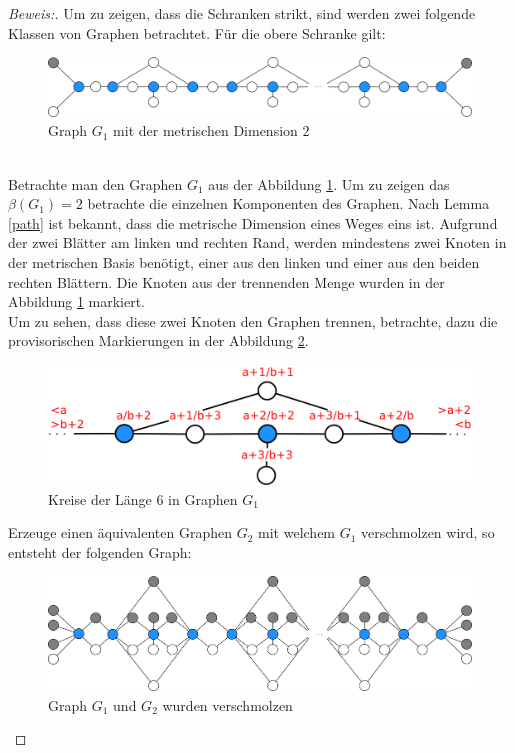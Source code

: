 \begin{proof}[Beweis:] 
Um zu zeigen, dass die Schranken strikt, sind werden zwei folgende Klassen von Graphen betrachtet. Für die obere Schranke gilt:\\
\begin{figure}[ht]
		\centering 		 
\includegraphics[width=420pt]{bilder/ver.pdf}
   \caption{Graph $G_1$ mit der metrischen Dimension $2$}
   \label{bild:Graphmd2}
  	 \end{figure}
\\
Betrachte man den Graphen $G_1$ aus der Abbildung \ref{bild:Graphmd2}.
Um zu zeigen das $\beta(G_1)=2$ betrachte die einzelnen Komponenten des Graphen. Nach Lemma \ref{path} ist bekannt, dass die metrische Dimension eines Weges eins ist. Aufgrund der zwei Blätter am linken und rechten Rand, werden mindestens zwei Knoten in der metrischen Basis benötigt, einer aus den linken und einer aus den beiden rechten Blättern. Die Knoten aus der trennenden Menge wurden in der Abbildung \ref{bild:Graphmd2} markiert.\\ Um zu sehen, dass diese zwei Knoten den Graphen trennen, betrachte, dazu die provisorischen Markierungen in der Abbildung \ref{bild:Kreise}.
\begin{figure}[h!]
		\centering 		 
\includegraphics[width=420pt]{bilder/ver2.pdf}
   \caption{Kreise der Länge 6 in Graphen $G_1$}
   \label{bild:Kreise}
  	 \end{figure} 
  	 
Erzeuge einen äquivalenten Graphen $G_2$ mit welchem $G_1$ verschmolzen wird, so entsteht der folgenden Graph:

\begin{figure}[h!]
		\centering 		 
\includegraphics[width=420pt]{bilder/verschmolzenlandmarks.pdf}
   \caption{Graph $G_1$ und $G_2$ wurden verschmolzen}
  	 \end{figure}


\end{proof}
